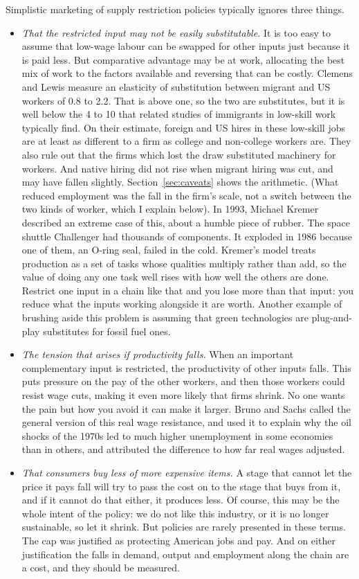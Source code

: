 \documentclass[11pt,a4paper]{article}
\begin{document}
Simplistic marketing of supply restriction policies typically ignores three things.
\begin{itemize}\itemsep2pt
\item \emph{That the restricted input may not be easily substitutable.} It is too easy to assume that low-wage labour can be swapped for other inputs just because it is paid less. But comparative advantage may be at work, allocating the best mix of work to the factors available and reversing that can be costly. Clemens and Lewis measure an elasticity of substitution between migrant and US workers of 0.8 to 2.2. That is above one, so the two are substitutes, but it is well below the 4 to 10 that related studies of immigrants in low-skill work typically find. On their estimate, foreign and US hires in these low-skill jobs are at least as different to a firm as college and non-college workers are. They also rule out that the firms which lost the draw substituted machinery for workers. And native hiring did not rise when migrant hiring was cut, and may have fallen slightly. Section~\ref{sec:caveats} shows the arithmetic. (What reduced employment was the fall in the firm's scale, not a switch between the two kinds of worker, which I explain below). In 1993, Michael Kremer described an extreme case of this, about a humble piece of rubber. The space shuttle Challenger had thousands of components. It exploded in 1986 because one of them, an O-ring seal, failed in the cold. Kremer's model treats production as a set of tasks whose qualities multiply rather than add, so the value of doing any one task well rises with how well the others are done. Restrict one input in a chain like that and you lose more than that input: you reduce what the inputs working alongside it are worth. Another example of brushing aside this problem is assuming that green technologies are plug-and-play substitutes for fossil fuel ones.

\item \emph{The tension that arises if productivity falls.} When an important complementary input is restricted, the productivity of other inputs falls. This puts pressure on the pay of the other workers, and then those workers could resist wage cuts, making it even more likely that firms shrink. No one wants the pain but how you avoid it can make it larger. Bruno and Sachs called the general version of this real wage resistance, and used it to explain why the oil shocks of the 1970s led to much higher unemployment in some economies than in others, and attributed the difference to how far real wages adjusted.

\item \emph{That consumers buy less of more expensive items.} A stage that cannot let the price it pays fall will try to pass the cost on to the stage that buys from it, and if it cannot do that either, it produces less. Of course, this may be the whole intent of the policy: we do not like this industry, or it is no longer sustainable, so let it shrink. But policies are rarely presented in these terms. The cap was justified as protecting American jobs and pay. And on either justification the falls in demand, output and employment along the chain are a cost, and they should be measured.
\end{itemize}
\end{document}
